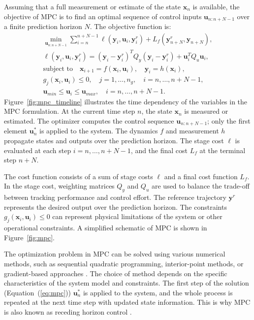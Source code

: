 Assuming that a full measurement or estimate of the state $\boldsymbol{x}_n$ is available, the objective of \ac{MPC} is to find an optimal sequence of control inputs $\boldsymbol{u}_{n:n+N-1}$ over a finite prediction horizon $N$. The objective function is:
\begin{subequations}
    \label{eq:mpc}
    \begin{gather}
        \min_{\boldsymbol{u}_{n:n+N-1}} \sum_{i=n}^{n+N-1}\ell(\boldsymbol{y}_{i}, \boldsymbol{u}_{i}, \boldsymbol{y}^r_{i})+L_f(\boldsymbol{y}^r_{n+N},\boldsymbol{y}_{n+N}),\\
        \ell(\boldsymbol{y}_{i}, \boldsymbol{u}_{i}, \boldsymbol{y}^r_{i})=(\boldsymbol{y}_{i}-\boldsymbol{y}^r_{i})^TQ_y(\boldsymbol{y}_{i}-\boldsymbol{y}^r_{i})+\boldsymbol{u}_{i}^TQ_u\boldsymbol{u}_{i},\\
        \text{subject to} \quad \boldsymbol{x}_{i+1} = f(\boldsymbol{x}_i, \boldsymbol{u}_i), \quad \boldsymbol{y}_i = h(\boldsymbol{x}_i),\\
        g_j(\boldsymbol{x}_i, \boldsymbol{u}_i)\leq 0, \quad j=1,\ldots,n_g, \quad i=n,\ldots,n+N-1,\\
        \boldsymbol{u}_{min}\leq\boldsymbol{u}_i\leq\boldsymbol{u}_{max}, \quad i=n,\ldots,n+N-1.
    \end{gather}
\end{subequations}
Figure~\ref{fig:mpc_timeline} illustrates the time dependency of the variables in the \ac{MPC} formulation. At the current time step $n$, the state $\boldsymbol{x}_n$ is measured or estimated. The optimizer computes the control sequence $\boldsymbol{u}_{n:n+N-1}$; only the first element $\boldsymbol{u}^*_n$ is applied to the system. The dynamics $f$ and measurement $h$ propagate states and outputs over the prediction horizon. The stage cost $\ell$ is evaluated at each step $i=n,\ldots,n+N-1$, and the final cost $L_f$ at the terminal step $n+N$.

The cost function consists of a sum of stage costs $\ell$ and a final cost function $L_f$. In the stage cost, weighting matrices $Q_y$ and $Q_u$ are used to balance the trade-off between tracking performance and control effort. The reference trajectory $\boldsymbol{y}^r$ represents the desired output over the prediction horizon. The constraints $g_j(\boldsymbol{x}_i, \boldsymbol{u}_i)\leq 0$ can represent physical limitations of the system or other operational constraints. A simplified schematic of \ac{MPC} is shown in Figure~\ref{fig:mpc}. 

The optimization problem in \ac{MPC} can be solved using various numerical methods, such as sequential quadratic programming, interior-point methods, or gradient-based approaches \citep{Diehl2013}. The choice of method depends on the specific characteristics of the system model and constraints. The first step of the solution (Equation~(\ref{eq:mpc})) $\boldsymbol{u}^*_n$ is applied to the system, and the whole process is repeated at the next time step with updated state information. This is why \ac{MPC} is also known as receding horizon control \citep{Christophersen2007}.

